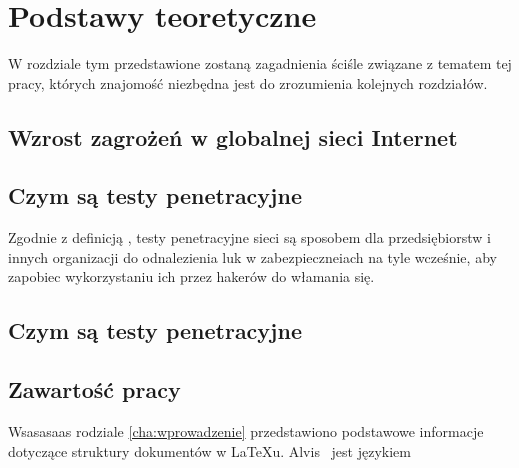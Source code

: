 \chapter{Podstawy teoretyczne}
\label{cha:teoria}

W rozdziale tym przedstawione zostaną zagadnienia ściśle związane z tematem tej pracy, których znajomość niezbędna jest do zrozumienia kolejnych rozdziałów. 




\section{Wzrost zagrożeń w globalnej sieci Internet}
\label{sec:penTest}







\section{Czym są testy penetracyjne}
\label{sec:penTest}

Zgodnie z definicją \cite{He2006}, testy penetracyjne sieci są sposobem dla przedsiębiorstw i innych organizacji do odnalezienia luk w zabezpieczneiach na tyle wcześnie, aby zapobiec wykorzystaniu ich przez hakerów do włamania się.




\section{Czym są testy penetracyjne}
\label{sec:penTest}






\section{Zawartość pracy}
\label{sec:zawartoscPracy}

Wsasasaas rodziale \ref{cha:wprowadzenie} przedstawiono podstawowe informacje dotyczące struktury dokumentów w \LaTeX u. Alvis~\cite{Alvis2011} jest językiem


